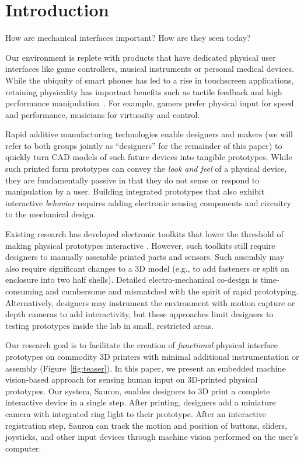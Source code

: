 \section{Introduction}
How are mechanical interfaces important?  How are they seen today?

Our environment is replete with products that have dedicated physical user interfaces like game controllers, musical instruments or personal medical devices.  While the ubiquity of smart phones has led to a rise in touchscreen applications, retaining physicality has important benefits such as tactile feedback and high performance manipulation~\cite{klemmer-bodies}. For example, gamers prefer physical input for speed and performance, musicians for virtuosity and control.

Rapid additive manufacturing technologies enable designers and makers (we will refer to both groups jointly as ``designers'' for the remainder of this paper) to quickly turn CAD models of such future devices into tangible prototypes. While such printed form prototypes can convey the {\em look and feel} of a physical device, they are fundamentally passive in that they do not sense or respond to manipulation by a user. Building integrated prototypes that also exhibit interactive {\em behavior} requires adding electronic sensing components and circuitry to the mechanical design. 

Existing research has developed electronic toolkits that lower the threshold of making physical prototypes interactive \cite{arduino, greenberg-phidgets, hartmann-d.tools}.
However, such toolkits still require designers to manually assemble printed parts and sensors. Such assembly may also require significant changes to a 3D model (e.g., to add fasteners or split an enclosure into two half shells).  Detailed electro-mechanical co-design is time-consuming and cumbersome and mismatched with the spirit of rapid prototyping. Alternatively, designers may instrument the environment with motion capture \cite{akaoka-displayobjects} or depth cameras \cite{wilson-kinect} to add interactivity, but these approaches limit designers to testing prototypes inside the lab in small, restricted areas.

Our research goal is to facilitate the creation of \emph{functional} physical interface prototypes on commodity 3D printers with minimal additional instrumentation or assembly (Figure~\ref{fig:teaser}).  In this paper, we present an embedded machine vision-based approach for sensing human input on 3D-printed physical prototypes. Our system, Sauron, enables designers to 3D print a complete interactive device in a single step. After printing, designers add a miniature camera with integrated ring light to their prototype.  After an interactive registration step, Sauron can track the motion and position of buttons, sliders, joysticks, and other input devices through machine vision performed on the user's computer.%

